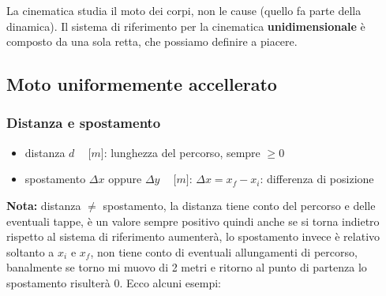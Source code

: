 \documentclass[../main.tex]{subfiles}
\begin{document}
La cinematica studia il moto dei corpi, non le cause (quello fa parte della dinamica).
Il sistema di riferimento per la cinematica \textbf{unidimensionale} è composto da una sola retta, che possiamo definire a piacere.

\subsection{Moto uniformemente accellerato}
\subsubsection{Distanza e spostamento}
\begin{itemize}
    \item distanza $d \phantom{-} \lbrack m \rbrack$: lunghezza del percorso, sempre $\geq 0$
    \item spostamento $\Delta x$ oppure $\Delta y \phantom{-} \lbrack m\rbrack$: $\Delta x=x_f-x_i$: differenza di posizione
\end{itemize}
\textbf{Nota:} distanza $\neq$ spostamento, la distanza tiene conto del percorso e delle eventuali tappe, è un valore sempre positivo quindi anche se si torna indietro rispetto al sistema di riferimento aumenterà, lo spostamento invece è relativo soltanto a $x_i$ e $x_f$, non tiene conto di eventuali allungamenti di percorso, banalmente se torno mi muovo di 2 metri e ritorno al punto di partenza lo spostamento risulterà 0. Ecco alcuni esempi:
\end{document}

